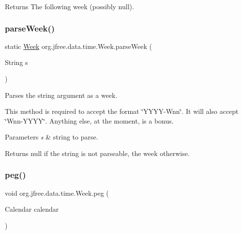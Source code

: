 \begin{DoxyReturn}{Returns}
The following week (possibly {\ttfamily null}). 
\end{DoxyReturn}
\mbox{\label{classorg_1_1jfree_1_1data_1_1time_1_1_week_aaea87c2280ded91989c8dd73a0bdf912}} 
\subsubsection{\texorpdfstring{parse\+Week()}{parseWeek()}}
{\footnotesize\ttfamily static \mbox{\hyperlink{classorg_1_1jfree_1_1data_1_1time_1_1_week}{Week}} org.\+jfree.\+data.\+time.\+Week.\+parse\+Week (\begin{DoxyParamCaption}\item[{String}]{s }\end{DoxyParamCaption})\hspace{0.3cm}{\ttfamily [static]}}

Parses the string argument as a week. 

This method is required to accept the format \char`\"{}\+Y\+Y\+Y\+Y-\/\+Wnn\char`\"{}. It will also accept \char`\"{}\+Wnn-\/\+Y\+Y\+Y\+Y\char`\"{}. Anything else, at the moment, is a bonus.


\begin{DoxyParams}{Parameters}
{\em s} & string to parse.\\
\hline
\end{DoxyParams}
\begin{DoxyReturn}{Returns}
{\ttfamily null} if the string is not parseable, the week otherwise. 
\end{DoxyReturn}
\mbox{\label{classorg_1_1jfree_1_1data_1_1time_1_1_week_ab58b703a2f1d37a0daffef7f6d509122}} 
\subsubsection{\texorpdfstring{peg()}{peg()}}
{\footnotesize\ttfamily void org.\+jfree.\+data.\+time.\+Week.\+peg (\begin{DoxyParamCaption}\item[{Calendar}]{calendar }\end{DoxyParamCaption})}


